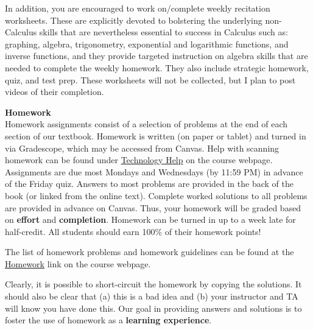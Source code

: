 \documentclass[12pt]{article}
\renewcommand{\emph}[1]{\textsf{\textbf{#1}}}
\newcommand{\localhead}[1]{\par\smallskip\textbf{#1}\nobreak\\}%
\def\heading#1{\localhead{\large\emph{#1}}}
\begin{document}
In addition, you are encouraged to work on/complete weekly recitation worksheets. These are explicitly devoted to bolstering the underlying non-Calculus skills that are nevertheless essential to success in Calculus such as: graphing, algebra, trigonometry, exponential and logarithmic functions, and inverse functions, and they provide targeted instruction on algebra skills that are needed to complete the weekly homework. They also include strategic homework, quiz, and test prep. These worksheets will not be collected, but I plan to post videos of their completion.

\heading{Homework}
Homework assignments consist of a selection of problems at the end of each section of our textbook. Homework is written (on paper or tablet) and turned in via Gradescope, which may be accessed from Canvas.  Help with scanning homework can be found under \href{https://uaf-math251.github.io/techHelp.html}{Technology Help} on the course webpage. Assignments are due most Mondays and Wednesdays (by 11:59 PM) in advance of the Friday quiz.  Answers to most problems are provided in the back of the book (or linked from the online text). Complete worked solutions to all problems are provided in advance on Canvas. Thus, your homework will be graded based on \emph{effort} and \emph{completion}. Homework can be turned in up to a week late for half-credit. All students should earn 100\% of their homework points!

The list of homework problems and homework guidelines can be found at the \href{https://uaf-math251.github.io/writtenhomework.html}{Homework} link on the course webpage.

Clearly, it is possible to short-circuit the homework by copying the solutions. It should also be clear that (a) this is a bad idea and (b) your instructor and TA will know you have done this. Our goal in providing answers and solutions is to foster the use of homework as a \emph{learning experience}. 
\end{document}
